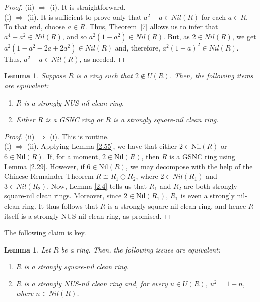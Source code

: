 \documentclass[12pt]{amsart}
\newtheorem{lemma}[theorem]{Lemma}
\theoremstyle{definition}
\begin{document}
\begin{proof}
(ii) $\Longrightarrow$ (i). It is straightforward.\\
(i) $\Longrightarrow$ (ii). It is sufficient to prove only that $a^2-a\in Nil(R)$ for each $a\in R$. To that end, choose $a\in R$. Thus, Theorem~\ref{7} allows us to infer that $a^4-a^2\in Nil(R)$, and so $a^2(1-a^2)\in Nil(R)$. But, as $2\in Nil(R)$, we get $a^2(1-a^2-2a+2a^2)\in Nil(R)$ and, therefore, $a^2(1-a)^2\in Nil(R)$. Thus, $a^2-a\in Nil(R)$, as needed.
\end{proof}

\begin{lemma}\label{2.56}
Suppose $R$ is a ring such that $2 \notin U(R)$. Then, the following items are equivalent:
\begin{enumerate}
\item
$R$ is a strongly NUS-nil clean ring.
\item
Either $R$ is a GSNC ring or $R$ is a strongly square-nil clean ring.
\end{enumerate}
\end{lemma}

\begin{proof}
(ii) $\Longrightarrow$ (i). This is routine.\\
(i) $\Longrightarrow$ (ii). Applying Lemma \ref{2.55}, we have that either $2 \in \text{Nil}(R)$ or $6 \in \text{Nil}(R)$. If, for a moment, $2 \in \text{Nil}(R)$, then $R$ is a GSNC ring using Lemma \ref{2.29}. However, if $6 \in \text{Nil}(R)$, we may decompose with the help of the Chinese Remainder Theorem $R \cong R_1 \oplus R_2$, where $2\in Nil(R_1)$ and $3\in Nil(R_2)$. Now, Lemma \ref{2.4} tells us that $R_1$ and $R_2$ are both strongly square-nil clean rings. Moreover, since $2 \in \text{Nil}(R_1)$, $R_1$ is even a strongly nil-clean ring. It thus follows that $R$ is a strongly square-nil clean ring, and hence $R$ itself is a strongly NUS-nil clean ring, as promised.
\end{proof}

The following claim is key.

\begin{lemma}\label{2.30}
Let $R$ be a ring. Then, the following issues are equivalent:
\begin{enumerate}
\item
$R$ is a strongly square-nil clean ring.
\item
$R$ is a strongly NUS-nil clean ring and, for every $u\in U(R)$, $u^2=1+n$, where $n\in Nil(R)$.
\end{enumerate}
\end{lemma}
\end{document}
